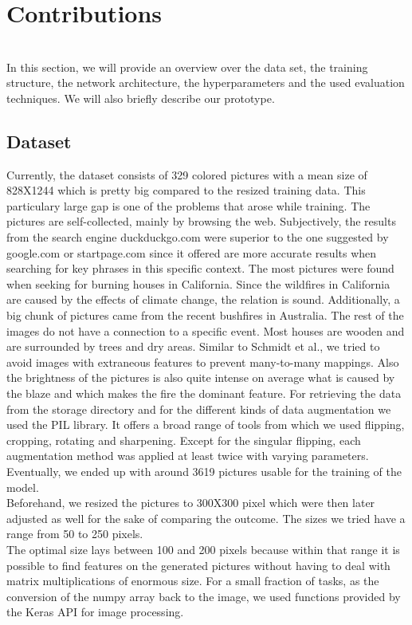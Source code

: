 \section{Contributions}
\\
In this section, we will provide an overview over the data set, the training structure, the network architecture, the hyperparameters and the used evaluation techniques. We will also briefly describe our prototype.  

    \subsection{Dataset}

    Currently, the dataset consists of 329 colored pictures with a mean size of 828X1244 which is pretty big compared to the resized training data. This particulary large gap is one of the problems that arose while training. The pictures are self-collected, mainly by browsing the web. Subjectively, the results from the search engine duckduckgo.com were superior to the one suggested by google.com or startpage.com since it offered are more accurate results when searching for key phrases in this specific context. \newline
    The most pictures were found when seeking for burning houses in California. Since the wildfires in California are caused by the effects of climate change, the relation is sound. \newline
    Additionally, a big chunk of pictures came from the recent bushfires in Australia. The rest of the images do not have a connection to a specific event. Most houses are wooden and are surrounded by trees and dry areas. Similar to Schmidt et al.\cite{schmidt2019visualizing}, we tried to avoid images with extraneous features to prevent many-to-many mappings. Also the brightness of the pictures is also quite intense on average what is caused by the blaze and which makes the fire the dominant feature. For retrieving the data from the storage directory and for the different kinds of data augmentation we used the PIL library. It offers a broad range of tools from which we used flipping, cropping, rotating and sharpening. Except for the singular flipping, each augmentation method was applied at least twice with varying parameters. Eventually, we ended up with around 3619 pictures usable for the training of the model.\\
    Beforehand, we resized the pictures to 300X300 pixel which were then later adjusted as well for the sake of comparing the outcome. The sizes we tried have a range from 50 to 250 pixels.\\
    The optimal size lays between 100 and 200 pixels because within that range it is possible to find features on the generated pictures without having to deal with matrix multiplications of enormous size.
    For a small fraction of tasks, as the conversion of the numpy array back to the image, we used functions provided by the Keras API for image processing.
    
